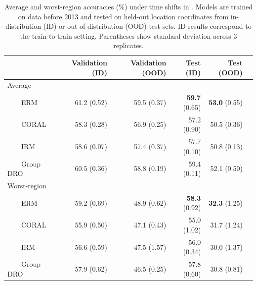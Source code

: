 \begin{table}[tbp]
  \caption{Average and worst-region accuracies (\%) under time shifts in \FMoW. Models are trained on data before 2013 and tested on held-out location coordinates from in-distribution (ID) or out-of-distribution (OOD) test sets.
  ID results correspond to the train-to-train setting.
  Parentheses show standard deviation across 3 replicates.}
  \centering
  \begin{tabular} {l r r r r r}
  \toprule
  & Validation (ID) & Validation (OOD) & Test (ID) & Test (OOD) \\
  \midrule
Average & & & & \\
~~~~ERM        & 61.2 (0.52) & 59.5 (0.37) & \textbf{59.7} (0.65) & \textbf{53.0} (0.55) \\
~~~~CORAL      & 58.3 (0.28) & 56.9 (0.25) & 57.2 (0.90) & 50.5 (0.36) \\
~~~~IRM        & 58.6 (0.07) & 57.4 (0.37) & 57.7 (0.10) & 50.8 (0.13) \\
~~~~Group DRO  & 60.5 (0.36) & 58.8 (0.19) & 59.4 (0.11) & 52.1 (0.50) \\
Worst-region & & & & \\
~~~~ERM        & 59.2 (0.69) & 48.9 (0.62) & \textbf{58.3} (0.92) & \textbf{32.3} (1.25) \\
~~~~CORAL      & 55.9 (0.50) & 47.1 (0.43) & 55.0 (1.02) & 31.7 (1.24) \\
~~~~IRM        & 56.6 (0.59) & 47.5 (1.57) & 56.0 (0.34) & 30.0 (1.37) \\
~~~~Group DRO  & 57.9 (0.62) & 46.5 (0.25) & 57.8 (0.60) & 30.8 (0.81) \\
  \bottomrule
\end{tabular}
\label{table:fmow-leaderboard}
\end{table}



